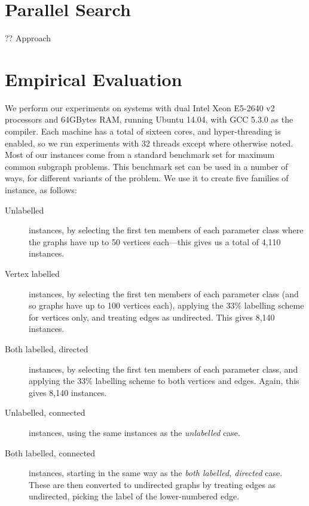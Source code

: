 \documentclass[sigconf]{acmart}
\begin{document}
\section{Parallel Search}

?? Approach

\section{Empirical Evaluation}

We perform our experiments on systems with dual Intel Xeon E5-2640 v2 processors and 64GBytes RAM,
running Ubuntu 14.04, with GCC 5.3.0 as the compiler. Each machine has a total of sixteen cores, and
hyper-threading is enabled, so we run experiments with 32 threads except where otherwise noted.
Most of our instances come from a standard benchmark set
\citep{DBLP:journals/prl/SantoFSV03,DBLP:journals/jgaa/ConteFV07} for maximum common subgraph
problems.  This benchmark set can be used in a number of ways, for different variants of the
problem. We use it to create five families of instance, as follows:

\begin{description}
    \item[Unlabelled] instances, by selecting the first ten members of each parameter class where the
        graphs have up to 50 vertices each---this gives us a total of 4,110 instances.

    \item[Vertex labelled] instances, by selecting the first ten members of each parameter class
        (and so graphs have up to 100 vertices each), applying the 33\% labelling scheme for
        vertices only, and treating edges as undirected. This gives 8,140 instances.

    \item[Both labelled, directed] instances, by selecting the first ten members of each parameter
        class, and applying the 33\% labelling scheme to both vertices and edges. Again, this gives
        8,140 instances.

    \item[Unlabelled, connected] instances, using the same instances as the \emph{unlabelled} case.

    \item[Both labelled, connected] instances, starting in the same way as the \emph{both labelled,
        directed} case. These are then converted to undirected graphs by treating edges as
        undirected, picking the label of the lower-numbered edge.
\end{description}
\end{document}
